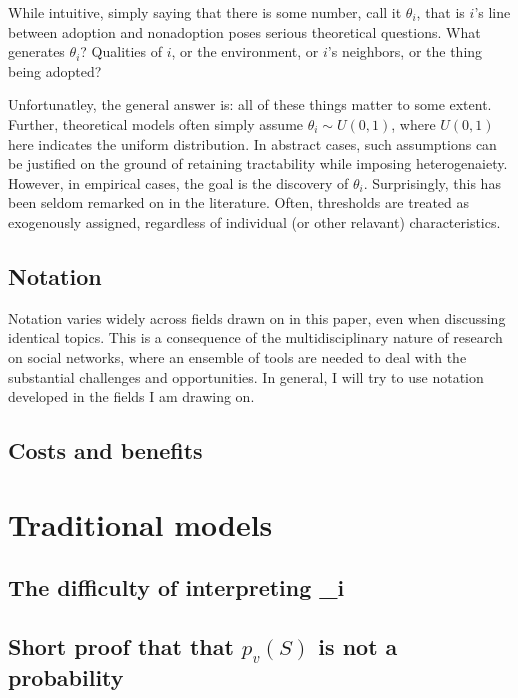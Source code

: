 \documentclass{article}
\begin{document}
While intuitive, simply saying that there is some number, call it $\theta_i$, that is $i$'s line between adoption and nonadoption poses serious theoretical questions. What generates $\theta_i$? Qualities of $i$, or the environment, or $i$'s neighbors, or the thing being adopted? 

Unfortunatley, the general answer is: all of these things matter to some extent. Further, theoretical models often simply assume $\theta_i \sim U(0,1)$, where $U(0,1)$ here indicates the uniform distribution. In abstract cases, such assumptions can be justified on the ground of retaining tractability while imposing heterogenaiety. However, in empirical cases, the goal is the discovery of $\theta_i$. Surprisingly, this has been seldom remarked on in the literature. Often, thresholds are treated as exogenously assigned, regardless of individual (or other relavant) characteristics.

\subsection{Notation}

Notation varies widely across fields drawn on in this paper, even when discussing identical topics. This is a consequence of the multidisciplinary nature of research on social networks, where an ensemble of tools are needed to deal with the substantial challenges and opportunities. In general, I will try to use notation developed in the fields I am drawing on. 



\subsection{Costs and benefits}

\section{Traditional models}

\subsection{The difficulty of interpreting \theta_i}

\subsection{Short proof that that $p_v(S)$ is not a probability}
\end{document}
